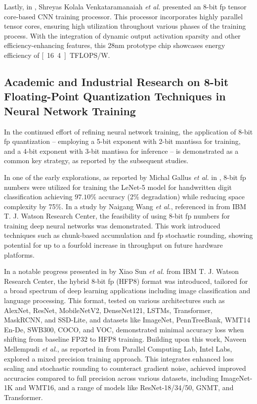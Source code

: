Lastly, in \cite{venkataramanaiah202228nm}, Shreyas Kolala Venkataramanaiah \textit{et al.} presented an 8-bit \gls{fp} tensor core-based CNN training processor. This processor incorporates highly parallel tensor cores, ensuring high utilization throughout various phases of the training process. With the integration of dynamic output activation sparsity and other efficiency-enhancing features, this 28nm prototype chip showcases energy efficiency of \unit[16.4]{TFLOPS/W}.



\subsection{Academic and Industrial Research on 8-bit Floating-Point Quantization Techniques in Neural Network Training}
In the continued effort of refining neural network training, the application of 8-bit \gls{fp} quantization -- employing a 5-bit exponent with 2-bit mantissa for training, and a 4-bit exponent with 3-bit mantissa for inference -- is demonstrated as a common key strategy, as reported by the subsequent studies.

In one of the early explorations, as reported by Michal Gallus \textit{et al.} in \cite{gallus2018handwritten}, 8-bit \gls{fp} numbers were utilized for training the LeNet-5 model for handwritten digit classification achieving $97.10\%$ accuracy (2\% degradation) while reducing space complexity by 75\%. In a study by Naigang Wang \textit{et al.}, referenced in \cite{wang2018training} from IBM T. J. Watson Research Center, the feasibility of using 8-bit \gls{fp} numbers for training deep neural networks was demonstrated. This work introduced techniques such as chunk-based accumulation and \gls{fp} stochastic rounding, showing potential for up to a fourfold increase in throughput on future hardware platforms.

In a notable progress presented in \cite{sun2019hybrid} by Xiao Sun \textit{et al.} from IBM T. J. Watson Research Center, the hybrid 8-bit \gls{fp} (HFP8) format was introduced, tailored for a broad spectrum of deep learning applications including image classification and language processing. This format, tested on various architectures such as AlexNet, ResNet, MobileNetV2, DenseNet121, LSTMs, Transformer, MaskRCNN, and SSD-Lite, and datasets like ImageNet, PennTreeBank, WMT14 En-De, SWB300, COCO, and VOC, demonstrated minimal accuracy loss when shifting from baseline FP32 to HFP8 training. Building upon this work, Naveen Mellempudi \textit{et al.}, as reported in \cite{mellempudi2019mixed} from Parallel Computing Lab, Intel Labs, explored a mixed precision training approach. This integrates enhanced loss scaling and stochastic rounding to counteract gradient noise, achieved improved accuracies compared to full precision across various datasets, including ImageNet-1K and WMT16, and a range of models like ResNet-18/34/50, GNMT, and Transformer.

